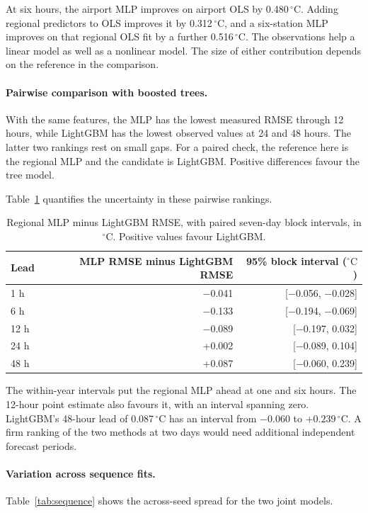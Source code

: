 \documentclass[11pt,letterpaper]{article}
\newcommand{\thead}[1]{\textbf{#1}}\newcommand{\bestscore}[1]{\textbf{#1}}
\newcommand{\celsius}{\ensuremath{^{\circ}\mathrm{C}}}\newcommand{\code}[1]{\texttt{\small #1}}
\begin{document}
At six hours, the airport MLP improves on airport OLS by 0.480\,\celsius. Adding regional predictors to OLS improves it by 0.312\,\celsius, and a six-station MLP improves on that regional OLS fit by a further 0.516\,\celsius. The observations help a linear model as well as a nonlinear model. The size of either contribution depends on the reference in the comparison.

\paragraph{Pairwise comparison with boosted trees.}
With the same features, the MLP has the lowest measured RMSE through 12 hours, while LightGBM has the lowest observed values at 24 and 48 hours. The latter two rankings rest on small gaps. For a paired check, the reference here is the regional MLP and the candidate is LightGBM. Positive differences favour the tree model.

Table~\ref{tab:tree} quantifies the uncertainty in these pairwise rankings.



\begin{table}[!htbp]
\centering\small
\caption{Regional MLP minus LightGBM RMSE, with paired seven-day block intervals, in \celsius. Positive values favour LightGBM.}\label{tab:tree}
\renewcommand{\arraystretch}{1.08}\begin{tabular*}{.93\linewidth}{@{\extracolsep{\fill}}lrr@{}}\toprule\thead{Lead}&\thead{MLP RMSE minus LightGBM RMSE}&\thead{95\% block interval (\celsius)}\\\midrule
1 h & −0.041 & [−0.056, −0.028] \\
6 h & −0.133 & [−0.194, −0.069] \\
12 h & −0.089 & [−0.197, 0.032] \\
24 h & +0.002 & [−0.089, 0.104] \\
48 h & +0.087 & [−0.060, 0.239] \\
\bottomrule\end{tabular*}
\end{table}


The within-year intervals put the regional MLP ahead at one and six hours. The 12-hour point estimate also favours it, with an interval spanning zero. LightGBM's 48-hour lead of 0.087\,\celsius{} has an interval from $-0.060$ to $+0.239$\,\celsius. A firm ranking of the two methods at two days would need additional independent forecast periods.


\paragraph{Variation across sequence fits.} Table~\ref{tab:sequence} shows the across-seed spread for the two joint models.
\end{document}
